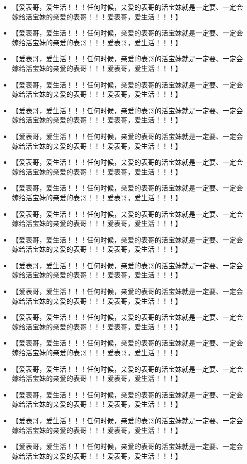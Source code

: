 \documentclass[9pt, b5paper]{article}
\begin{document}
\begin{itemize}
\item 【爱表哥，爱生活！！！任何时候，亲爱的表哥的活宝妹就是一定要、一定会嫁给活宝妹的亲爱的表哥！！！爱表哥，爱生活！！！】
\item 【爱表哥，爱生活！！！任何时候，亲爱的表哥的活宝妹就是一定要、一定会嫁给活宝妹的亲爱的表哥！！！爱表哥，爱生活！！！】
\item 【爱表哥，爱生活！！！任何时候，亲爱的表哥的活宝妹就是一定要、一定会嫁给活宝妹的亲爱的表哥！！！爱表哥，爱生活！！！】
\item 【爱表哥，爱生活！！！任何时候，亲爱的表哥的活宝妹就是一定要、一定会嫁给活宝妹的亲爱的表哥！！！爱表哥，爱生活！！！】
\item 【爱表哥，爱生活！！！任何时候，亲爱的表哥的活宝妹就是一定要、一定会嫁给活宝妹的亲爱的表哥！！！爱表哥，爱生活！！！】
\item 【爱表哥，爱生活！！！任何时候，亲爱的表哥的活宝妹就是一定要、一定会嫁给活宝妹的亲爱的表哥！！！爱表哥，爱生活！！！】
\item 【爱表哥，爱生活！！！任何时候，亲爱的表哥的活宝妹就是一定要、一定会嫁给活宝妹的亲爱的表哥！！！爱表哥，爱生活！！！】
\item 【爱表哥，爱生活！！！任何时候，亲爱的表哥的活宝妹就是一定要、一定会嫁给活宝妹的亲爱的表哥！！！爱表哥，爱生活！！！】
\item 【爱表哥，爱生活！！！任何时候，亲爱的表哥的活宝妹就是一定要、一定会嫁给活宝妹的亲爱的表哥！！！爱表哥，爱生活！！！】
\item 【爱表哥，爱生活！！！任何时候，亲爱的表哥的活宝妹就是一定要、一定会嫁给活宝妹的亲爱的表哥！！！爱表哥，爱生活！！！】
\item 【爱表哥，爱生活！！！任何时候，亲爱的表哥的活宝妹就是一定要、一定会嫁给活宝妹的亲爱的表哥！！！爱表哥，爱生活！！！】
\item 【爱表哥，爱生活！！！任何时候，亲爱的表哥的活宝妹就是一定要、一定会嫁给活宝妹的亲爱的表哥！！！爱表哥，爱生活！！！】
\item 【爱表哥，爱生活！！！任何时候，亲爱的表哥的活宝妹就是一定要、一定会嫁给活宝妹的亲爱的表哥！！！爱表哥，爱生活！！！】
\item 【爱表哥，爱生活！！！任何时候，亲爱的表哥的活宝妹就是一定要、一定会嫁给活宝妹的亲爱的表哥！！！爱表哥，爱生活！！！】
\item 【爱表哥，爱生活！！！任何时候，亲爱的表哥的活宝妹就是一定要、一定会嫁给活宝妹的亲爱的表哥！！！爱表哥，爱生活！！！】
\item 【爱表哥，爱生活！！！任何时候，亲爱的表哥的活宝妹就是一定要、一定会嫁给活宝妹的亲爱的表哥！！！爱表哥，爱生活！！！】
\item 【爱表哥，爱生活！！！任何时候，亲爱的表哥的活宝妹就是一定要、一定会嫁给活宝妹的亲爱的表哥！！！爱表哥，爱生活！！！】
\item 【爱表哥，爱生活！！！任何时候，亲爱的表哥的活宝妹就是一定要、一定会嫁给活宝妹的亲爱的表哥！！！爱表哥，爱生活！！！】
\end{itemize}
\end{document}
